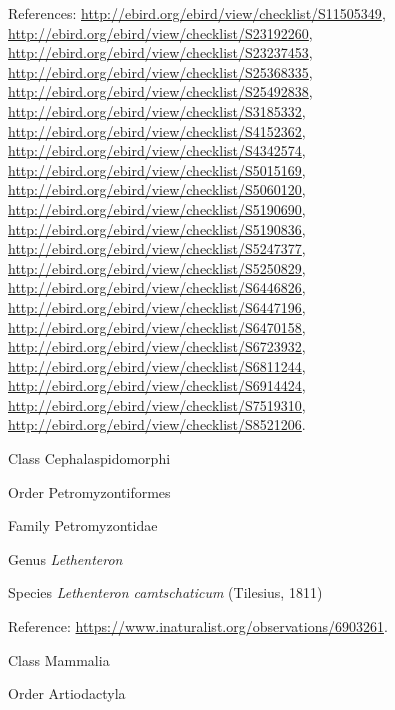 \documentclass[9pt, article]{memoir}
\begin{document}
\begin{multicols}{2}
References: 
\url{http://ebird.org/ebird/view/checklist/S11505349}, 
\url{http://ebird.org/ebird/view/checklist/S23192260}, 
\url{http://ebird.org/ebird/view/checklist/S23237453}, 
\url{http://ebird.org/ebird/view/checklist/S25368335}, 
\url{http://ebird.org/ebird/view/checklist/S25492838}, 
\url{http://ebird.org/ebird/view/checklist/S3185332}, 
\url{http://ebird.org/ebird/view/checklist/S4152362}, 
\url{http://ebird.org/ebird/view/checklist/S4342574}, 
\url{http://ebird.org/ebird/view/checklist/S5015169}, 
\url{http://ebird.org/ebird/view/checklist/S5060120}, 
\url{http://ebird.org/ebird/view/checklist/S5190690}, 
\url{http://ebird.org/ebird/view/checklist/S5190836}, 
\url{http://ebird.org/ebird/view/checklist/S5247377}, 
\url{http://ebird.org/ebird/view/checklist/S5250829}, 
\url{http://ebird.org/ebird/view/checklist/S6446826}, 
\url{http://ebird.org/ebird/view/checklist/S6447196}, 
\url{http://ebird.org/ebird/view/checklist/S6470158}, 
\url{http://ebird.org/ebird/view/checklist/S6723932}, 
\url{http://ebird.org/ebird/view/checklist/S6811244}, 
\url{http://ebird.org/ebird/view/checklist/S6914424}, 
\url{http://ebird.org/ebird/view/checklist/S7519310}, 
\url{http://ebird.org/ebird/view/checklist/S8521206}.

\vspace{6pt}\noindent\hspace{12pt}Class Cephalaspidomorphi


\vspace{6pt}\noindent\hspace{18pt}Order Petromyzontiformes


\vspace{6pt}\noindent\hspace{24pt}Family Petromyzontidae


\vspace{6pt}\noindent\hspace{30pt}Genus \textit{Lethenteron}


\vspace{6pt}\noindent\hspace{36pt}Species \textit{Lethenteron camtschaticum} (Tilesius, 1811)


Reference: 
\url{https://www.inaturalist.org/observations/6903261}.

\vspace{6pt}\noindent\hspace{12pt}Class Mammalia


\vspace{6pt}\noindent\hspace{18pt}Order Artiodactyla



\end{multicols}
\end{document}
